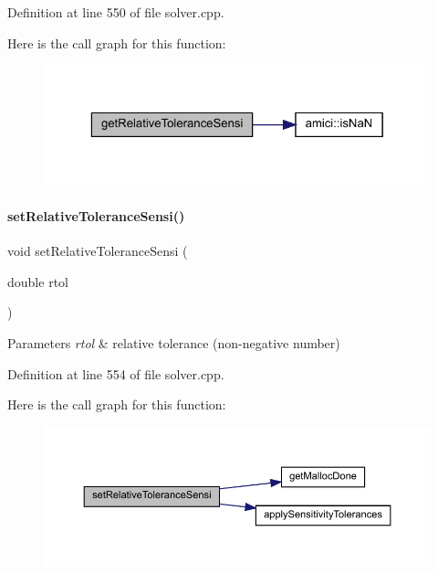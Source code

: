 Definition at line 550 of file solver.\+cpp.

Here is the call graph for this function\+:
\nopagebreak
\begin{figure}[H]
\begin{center}
\leavevmode
\includegraphics[width=323pt]{classamici_1_1_solver_a399bb102a2481c2c4c421d700dd2f0a2_cgraph}
\end{center}
\end{figure}
\mbox{\label{classamici_1_1_solver_a140b4219a601b17daf5f90f2255d1f22}} 
\paragraph{\texorpdfstring{set\+Relative\+Tolerance\+Sensi()}{setRelativeToleranceSensi()}}
{\footnotesize\ttfamily void set\+Relative\+Tolerance\+Sensi (\begin{DoxyParamCaption}\item[{double}]{rtol }\end{DoxyParamCaption})}


\begin{DoxyParams}{Parameters}
{\em rtol} & relative tolerance (non-\/negative number) \\
\hline
\end{DoxyParams}


Definition at line 554 of file solver.\+cpp.

Here is the call graph for this function\+:
\nopagebreak
\begin{figure}[H]
\begin{center}
\leavevmode
\includegraphics[width=350pt]{classamici_1_1_solver_a140b4219a601b17daf5f90f2255d1f22_cgraph}
\end{center}
\end{figure}
\mbox{\label{classamici_1_1_solver_aef5bbdb68233061923a99a5f448b263a}} 
